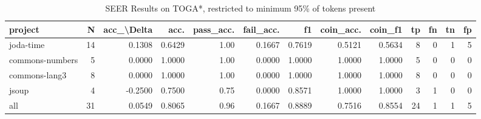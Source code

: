 \begin{table}
\centering
\caption{SEER Results on TOGA*, restricted to minimum 95\% of tokens present}
\label{tab:toga_results_05}
\begin{tabular}{lrrrrrrrrrrrr}
\toprule
         project &   N &  acc\_\textbackslash Delta &    acc. &  pass\_acc. &  fail\_acc. &      f1 &  coin\_acc. &  coin\_f1 &  tp &  fn &  tn &  fp \\
\midrule
       joda-time &  14 &      0.1308 &  0.6429 &       1.00 &     0.1667 &  0.7619 &     0.5121 &   0.5634 &   8 &   0 &   1 &   5 \\
 commons-numbers &   5 &      0.0000 &  1.0000 &       1.00 &     0.0000 &  1.0000 &     1.0000 &   1.0000 &   5 &   0 &   0 &   0 \\
   commons-lang3 &   8 &      0.0000 &  1.0000 &       1.00 &     0.0000 &  1.0000 &     1.0000 &   1.0000 &   8 &   0 &   0 &   0 \\
           jsoup &   4 &     -0.2500 &  0.7500 &       0.75 &     0.0000 &  0.8571 &     1.0000 &   1.0000 &   3 &   1 &   0 &   0 \\
             all &  31 &      0.0549 &  0.8065 &       0.96 &     0.1667 &  0.8889 &     0.7516 &   0.8554 &  24 &   1 &   1 &   5 \\
\bottomrule
\end{tabular}
\end{table}
